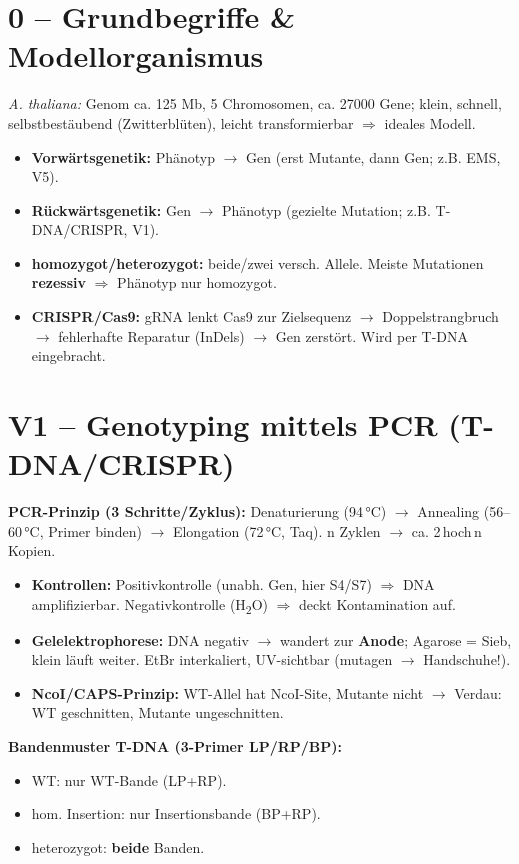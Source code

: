 



\section{0 -- Grundbegriffe \& Modellorganismus}
\emph{A. thaliana:} Genom ca. 125 Mb, 5 Chromosomen, ca. 27000 Gene; klein, schnell, selbstbestäubend (Zwitterblüten), leicht transformierbar $\Rightarrow$ ideales Modell.
\begin{itemize}
    \item \textbf{Vorwärtsgenetik:} Phänotyp $\to$ Gen (erst Mutante, dann Gen; z.B. EMS, V5).
    \item \textbf{Rückwärtsgenetik:} Gen $\to$ Phänotyp (gezielte Mutation; z.B. T-DNA/CRISPR, V1).
    \item \textbf{homozygot/heterozygot:} beide/zwei versch. Allele. Meiste Mutationen \textbf{rezessiv} $\Rightarrow$ Phänotyp nur homozygot.
    \item \textbf{CRISPR/Cas9:} gRNA lenkt Cas9 zur Zielsequenz $\to$ Doppelstrangbruch $\to$ fehlerhafte Reparatur (InDels) $\to$ Gen zerstört. Wird per T-DNA eingebracht.
\end{itemize}




\section{V1 -- Genotyping mittels PCR (T-DNA/CRISPR)}
\textbf{PCR-Prinzip (3 Schritte/Zyklus):} Denaturierung (94\,°C) $\to$ Annealing (56--60\,°C, Primer binden) $\to$ Elongation (72\,°C, Taq). n Zyklen $\to$ ca. 2\,hoch\,n Kopien.
\begin{itemize}
    \item \textbf{Kontrollen:} Positivkontrolle (unabh. Gen, hier S4/S7) $\Rightarrow$ DNA amplifizierbar. Negativkontrolle (H\textsubscript{2}O) $\Rightarrow$ deckt Kontamination auf.
    \item \textbf{Gelelektrophorese:} DNA negativ $\to$ wandert zur \textbf{Anode}; Agarose = Sieb, klein läuft weiter. EtBr interkaliert, UV-sichtbar (mutagen $\to$ Handschuhe!).
    \item \textbf{NcoI/CAPS-Prinzip:} WT-Allel hat NcoI-Site, Mutante nicht $\to$ Verdau: WT geschnitten, Mutante ungeschnitten.
\end{itemize}
\textbf{Bandenmuster T-DNA (3-Primer LP/RP/BP):}
\begin{itemize}
    \item WT: nur WT-Bande (LP+RP).
    \item hom. Insertion: nur Insertionsbande (BP+RP).
    \item heterozygot: \textbf{beide} Banden.
\end{itemize}



